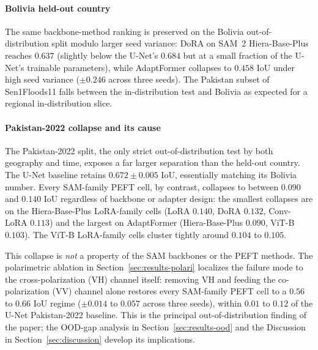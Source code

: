 \documentclass[conference]{IEEEtran}
\newcommand{\maxwidthtable}[1]{%
  \resizebox{\ifdim\width>\linewidth \linewidth\else \width\fi}{!}{#1}%
}
\begin{document}
\paragraph{Bolivia held-out country}
The same backbone-method ranking is preserved on the Bolivia out-of-distribution split modulo larger seed variance: DoRA on SAM~2 Hiera-Base-Plus reaches $0.637$ (slightly below the U-Net's $0.684$ but at a small fraction of the U-Net's trainable parameters), while AdaptFormer collapses to $0.458$ IoU under high seed variance ($\pm 0.246$ across three seeds). The Pakistan subset of Sen1Floods11 falls between the in-distribution test and Bolivia as expected for a regional in-distribution slice.

\paragraph{Pakistan-2022 collapse and its cause}
The Pakistan-2022 split, the only strict out-of-distribution test by both geography and time, exposes a far larger separation than the held-out country. The U-Net baseline retains $0.672 \pm 0.005$ IoU, essentially matching its Bolivia number. Every SAM-family PEFT cell, by contrast, collapses to between $0.090$ and $0.140$ IoU regardless of backbone or adapter design: the smallest collapses are on the Hiera-Base-Plus LoRA-family cells (LoRA $0.140$, DoRA $0.132$, Conv-LoRA $0.113$) and the largest on AdaptFormer (Hiera-Base-Plus $0.090$, ViT-B $0.103$). The ViT-B LoRA-family cells cluster tightly around $0.104$ to $0.105$.

This collapse is \emph{not} a property of the SAM backbones or the PEFT methods. The polarimetric ablation in Section~\ref{sec:results-polari} localizes the failure mode to the cross-polarization (VH) channel itself: removing VH and feeding the co-polarization (VV) channel alone restores every SAM-family PEFT cell to a $0.56$ to $0.66$ IoU regime ($\pm 0.014$ to $0.057$ across three seeds), within $0.01$ to $0.12$ of the U-Net Pakistan-2022 baseline. This is the principal out-of-distribution finding of the paper; the OOD-gap analysis in Section~\ref{sec:results-ood} and the Discussion in Section~\ref{sec:discussion} develop its implications.

\begin{table}[tbp]
\centering
\caption{Principal results. Mean IoU $\pm$ one standard deviation across three random seeds for each (backbone, PEFT) combination, on the four evaluation splits. Higher IoU is better. The U-Net row is a from-scratch ResNet-34 baseline; the two zero-shot rows are pretrained SAM-family encoders with no fine-tuning, prompted with a whole-image box. The principal Pakistan-2022 collapse and its single-polarization recovery are discussed in Sections~\ref{sec:results-headline} and~\ref{sec:results-polari}.}
\label{tab:results_main}
\maxwidthtable{%
%
}
\end{table}
\end{document}
